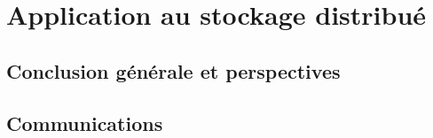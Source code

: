 
%


%

\part{Application au stockage distribué}


%


%


%


%


%

\chapter{Conclusion générale et perspectives}



%

\endrefsegment

\chapter*{Communications}



%

\printbibliography[
    heading=bibintoc,
    segment=1
]




\backmatter


